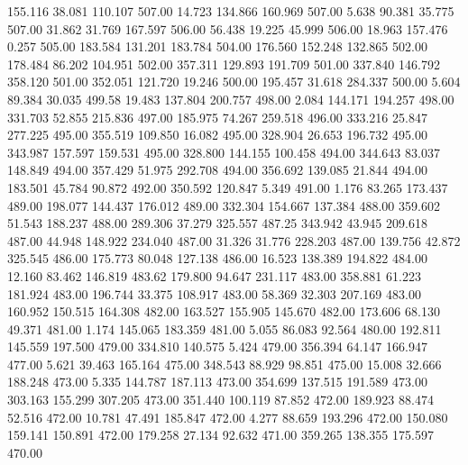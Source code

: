  155.116   38.081  110.107       507.00
  14.723  134.866  160.969       507.00
   5.638   90.381   35.775       507.00
  31.862   31.769  167.597       506.00
  56.438   19.225   45.999       506.00
  18.963  157.476    0.257       505.00
 183.584  131.201  183.784       504.00
 176.560  152.248  132.865       502.00
 178.484   86.202  104.951       502.00
 357.311  129.893  191.709       501.00
 337.840  146.792  358.120       501.00
 352.051  121.720   19.246       500.00
 195.457   31.618  284.337       500.00
   5.604   89.384   30.035       499.58
  19.483  137.804  200.757       498.00
   2.084  144.171  194.257       498.00
 331.703   52.855  215.836       497.00
 185.975   74.267  259.518       496.00
 333.216   25.847  277.225       495.00
 355.519  109.850   16.082       495.00
 328.904   26.653  196.732       495.00
 343.987  157.597  159.531       495.00
 328.800  144.155  100.458       494.00
 344.643   83.037  148.849       494.00
 357.429   51.975  292.708       494.00
 356.692  139.085   21.844       494.00
 183.501   45.784   90.872       492.00
 350.592  120.847    5.349       491.00
   1.176   83.265  173.437       489.00
 198.077  144.437  176.012       489.00
 332.304  154.667  137.384       488.00
 359.602   51.543  188.237       488.00
 289.306   37.279  325.557       487.25
 343.942   43.945  209.618       487.00
  44.948  148.922  234.040       487.00
  31.326   31.776  228.203       487.00
 139.756   42.872  325.545       486.00
 175.773   80.048  127.138       486.00
  16.523  138.389  194.822       484.00
  12.160   83.462  146.819       483.62
 179.800   94.647  231.117       483.00
 358.881   61.223  181.924       483.00
 196.744   33.375  108.917       483.00
  58.369   32.303  207.169       483.00
 160.952  150.515  164.308       482.00
 163.527  155.905  145.670       482.00
 173.606   68.130   49.371       481.00
   1.174  145.065  183.359       481.00
   5.055   86.083   92.564       480.00
 192.811  145.559  197.500       479.00
 334.810  140.575    5.424       479.00
 356.394   64.147  166.947       477.00
   5.621   39.463  165.164       475.00
 348.543   88.929   98.851       475.00
  15.008   32.666  188.248       473.00
   5.335  144.787  187.113       473.00
 354.699  137.515  191.589       473.00
 303.163  155.299  307.205       473.00
 351.440  100.119   87.852       472.00
 189.923   88.474   52.516       472.00
  10.781   47.491  185.847       472.00
   4.277   88.659  193.296       472.00
 150.080  159.141  150.891       472.00
 179.258   27.134   92.632       471.00
 359.265  138.355  175.597       470.00
